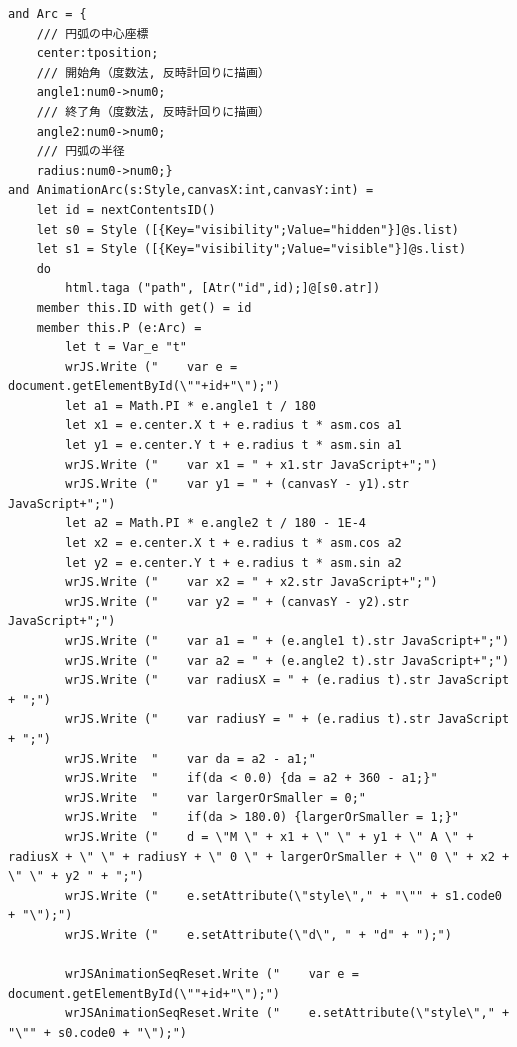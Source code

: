  \begin{lstlisting}[caption={円弧を描画するアニメーション},label={Arc},breaklines=true,breakatwhitespace=false]
and Arc = {
    /// 円弧の中心座標
    center:tposition;
    /// 開始角（度数法, 反時計回りに描画）
    angle1:num0->num0;
    /// 終了角（度数法, 反時計回りに描画）
    angle2:num0->num0;
    /// 円弧の半径
    radius:num0->num0;}
and AnimationArc(s:Style,canvasX:int,canvasY:int) =
    let id = nextContentsID()
    let s0 = Style ([{Key="visibility";Value="hidden"}]@s.list)
    let s1 = Style ([{Key="visibility";Value="visible"}]@s.list)
    do
        html.taga ("path", [Atr("id",id);]@[s0.atr])
    member this.ID with get() = id
    member this.P (e:Arc) = 
        let t = Var_e "t"
        wrJS.Write ("    var e = document.getElementById(\""+id+"\");")
        let a1 = Math.PI * e.angle1 t / 180
        let x1 = e.center.X t + e.radius t * asm.cos a1
        let y1 = e.center.Y t + e.radius t * asm.sin a1
        wrJS.Write ("    var x1 = " + x1.str JavaScript+";")
        wrJS.Write ("    var y1 = " + (canvasY - y1).str JavaScript+";")
        let a2 = Math.PI * e.angle2 t / 180 - 1E-4
        let x2 = e.center.X t + e.radius t * asm.cos a2
        let y2 = e.center.Y t + e.radius t * asm.sin a2
        wrJS.Write ("    var x2 = " + x2.str JavaScript+";")
        wrJS.Write ("    var y2 = " + (canvasY - y2).str JavaScript+";")
        wrJS.Write ("    var a1 = " + (e.angle1 t).str JavaScript+";")
        wrJS.Write ("    var a2 = " + (e.angle2 t).str JavaScript+";")
        wrJS.Write ("    var radiusX = " + (e.radius t).str JavaScript + ";")
        wrJS.Write ("    var radiusY = " + (e.radius t).str JavaScript + ";")
        wrJS.Write  "    var da = a2 - a1;"
        wrJS.Write  "    if(da < 0.0) {da = a2 + 360 - a1;}"
        wrJS.Write  "    var largerOrSmaller = 0;"
        wrJS.Write  "    if(da > 180.0) {largerOrSmaller = 1;}"
        wrJS.Write ("    d = \"M \" + x1 + \" \" + y1 + \" A \" + radiusX + \" \" + radiusY + \" 0 \" + largerOrSmaller + \" 0 \" + x2 + \" \" + y2 " + ";")
        wrJS.Write ("    e.setAttribute(\"style\"," + "\"" + s1.code0 + "\");")
        wrJS.Write ("    e.setAttribute(\"d\", " + "d" + ");")
        
        wrJSAnimationSeqReset.Write ("    var e = document.getElementById(\""+id+"\");")
        wrJSAnimationSeqReset.Write ("    e.setAttribute(\"style\"," + "\"" + s0.code0 + "\");")
\end{lstlisting}
